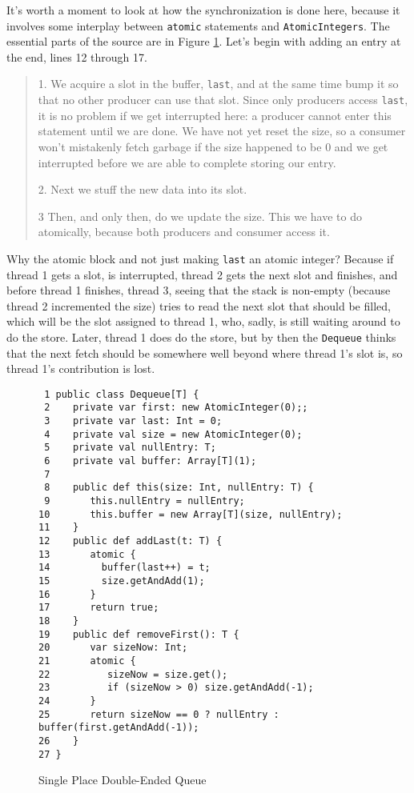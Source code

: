It's worth a moment to look at how the synchronization is done here, because it
involves some interplay between {\tt atomic} statements and 
{\tt AtomicIntegers}.  The essential parts of the source are in Figure
\ref{fig:deq}.  Let's begin with adding an entry at the end, lines 12 through
17.
\begin{quote}
1. We acquire a slot in the buffer, {\tt last}, and at the same
time bump it so that no other producer can use that slot. Since only producers
access {\tt last}, it is no problem if we get interrupted here: a producer
cannot enter this statement until we are done. We have not yet reset the size,
so a consumer won't mistakenly fetch garbage if the size happened to be 0 
and we get interrupted before we are able to complete storing our entry.

2. Next we stuff the new data into its slot.

3 Then, and only then, do we update the size.  This we have to do atomically,
because both producers and consumer access it.
\end{quote}

Why the atomic block and not just making {\tt last} an atomic integer?  Because
if thread 1 gets a slot, is interrupted, thread 2 gets the next slot and
finishes, and before thread 1 finishes, thread 3, seeing that the stack is
non-empty (because thread 2 incremented the size) tries to read the next
slot that should be filled, which will be the slot assigned to thread 1, who,
sadly, is still waiting around to do the store.  Later, thread 1 does do the
store, but by then the {\tt Dequeue} thinks that the next fetch should be
somewhere well beyond where thread 1's slot is, so thread 1's contribution is
lost.

 \begin{figure}[!htbp] 
\hrulefill
\begin{verbatim}
 1 public class Dequeue[T] {
 2    private var first: new AtomicInteger(0);;
 3    private var last: Int = 0;
 4    private val size = new AtomicInteger(0);
 5    private val nullEntry: T;
 6    private val buffer: Array[T](1);
 7
 8    public def this(size: Int, nullEntry: T) {
 9       this.nullEntry = nullEntry;
10       this.buffer = new Array[T](size, nullEntry);
11    }
12    public def addLast(t: T) {
13       atomic { 
14         buffer(last++) = t;
15         size.getAndAdd(1);
16       }
17       return true;
18    }
19    public def removeFirst(): T {
20       var sizeNow: Int;
21       atomic {
22          sizeNow = size.get();
23          if (sizeNow > 0) size.getAndAdd(-1);
24       }
25       return sizeNow == 0 ? nullEntry : buffer(first.getAndAdd(-1));
26    }
27 }
\end{verbatim}
\caption{Single Place Double-Ended Queue}
\label{fig:deq}
\hrulefill
\end{figure}
